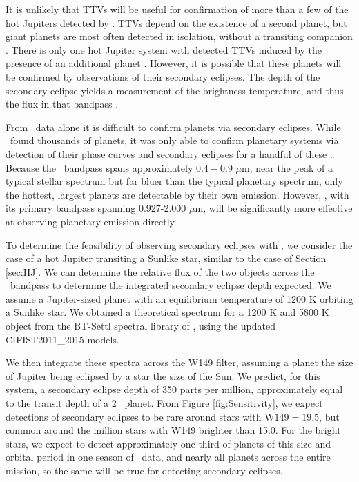 It is unlikely that TTVs will be useful for confirmation of more than a few of the 
hot Jupiters detected by \WF.
TTVs depend on the existence of a second planet, but
giant planets are most often detected in isolation, without a transiting companion
\citep{Steffen12c}.
There is only one hot Jupiter system with detected TTVs induced
by the presence of an additional planet \citep{Becker15}. 
However, it is possible that these planets will be confirmed by observations of their
secondary eclipses. The depth of the secondary eclipse yields a measurement of the
brightness temperature, and thus the flux in that bandpass \citep[e.g.][]{Charbonneau05}.

From \kep\ data alone it is difficult to confirm planets via secondary eclipses.
While \kep\ found thousands of planets, it was only able to confirm planetary systems
via detection of their phase curves and 
secondary eclipses for a handful of these \citep[e.g.][]{Esteves13, Quintana13, Angerhausen15}. 
Because the \kep\ bandpass spans approximately $0.4-0.9$ $\mu$m, near the peak of a typical
stellar spectrum but far bluer than the typical planetary spectrum, only the hottest,
largest planets are detectable by their own emission. 
However, \WF, with its primary bandpass spanning 0.927-2.000 $\mu$m, will be significantly 
more effective at observing planetary emission directly. 

To determine the feasibility of observing secondary eclipses with \WF, we consider the case of a hot Jupiter transiting a Sunlike star, similar to the
case of Section \ref{sec:HJ}. 
We can determine the relative flux of the two objects across the \WF\ bandpass to determine
the integrated secondary eclipse depth expected.
We assume a Jupiter-sized planet with an equilibrium temperature of 1200 K orbiting a 
Sunlike star.
We obtained a theoretical spectrum for a 1200 K and 5800 K object from the BT-Settl
spectral library of \citet{Baraffe15}, using the updated CIFIST2011\_2015 models.

We then integrate these spectra across the W149 filter, assuming a planet the size of 
Jupiter being eclipsed by a star the size of the Sun.
We predict, for this system, a secondary eclipse depth of 350 parts per million, approximately equal to the transit depth of a $2$ \rearth\ planet.
From Figure \ref{fig:Sensitivity}, we expect detections of secondary eclipses to be
rare around stars with $\textrm{W149} = 19.5$, but common around the million stars with 
W149 brighter than 15.0.
For the bright stars, we expect to detect approximately one-third
of planets of this size and orbital period in one season of \WF\ data, and nearly
all planets across the entire mission, so the same will be true for detecting secondary
eclipses. 

